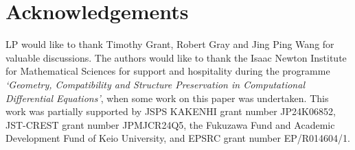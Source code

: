 \documentclass[11pt]{article} %
\numberwithin{equation}{section}
\theoremstyle{plain}
\theoremstyle{definition}
\begin{document}
\section*{Acknowledgements} 
LP would like to thank Timothy Grant, Robert Gray and Jing Ping Wang for valuable discussions.  The authors would like to thank the Isaac Newton Institute for Mathematical Sciences for support and hospitality during the programme {\it `Geometry, Compatibility and Structure Preservation in Computational Differential Equations'}, when some work on this paper was undertaken. This work was partially supported by JSPS KAKENHI grant number JP24K06852, JST-CREST grant number JPMJCR24Q5,  the Fukuzawa Fund and Academic Development Fund of Keio University, and EPSRC grant number EP/R014604/1.
\end{document}
